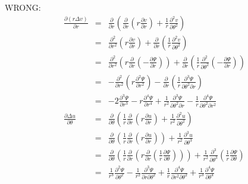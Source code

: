 WRONG:
\begin{eqnarray}
\frac{\partial (r  \Delta v)}{\partial r}
&=&
\frac{\partial}{\partial r} \left(   \frac{\partial }{\partial r} \left( r  \frac{\partial v}{\partial r} \right) +  \frac{1}{r} \frac{\partial^2 v}{\partial \theta^2}  \right) \\
&=&
\frac{\partial^2 }{\partial r^2} \left( r  \frac{\partial v}{\partial r} \right) 
+ \frac{\partial }{\partial r} \left( \frac{1}{r} \frac{\partial^2 v}{\partial \theta^2} \right) \\
&=&
\frac{\partial^2 }{\partial r^2} \left( r  \frac{\partial }{\partial r} ( - \frac{\partial \Psi}{\partial r}  ) \right) + \frac{\partial }{\partial r} \left( \frac{1}{r} \frac{\partial^2 }{\partial \theta^2} (- \frac{\partial \Psi}{\partial r}) \right) \\ 
&=&
- \frac{\partial^2 }{\partial r^2} \left( r    \frac{\partial^2 \Psi}{\partial r^2}   \right) - \frac{\partial }{\partial r} \left( \frac{1}{r} \frac{\partial^3 \Psi}{\partial \theta^2 \partial r}  \right) \\ 
&=& - 2  \frac{\partial^3 \Psi}{\partial r^3}  -  r \frac{\partial^4 \Psi}{\partial r^4}
+\frac{1}{r^2} \frac{\partial^3 \Psi}{\partial \theta^2 \partial r}  
- \frac{1}{r} \frac{\partial^4 \Psi}{\partial \theta^2 \partial r^2}
\\
\frac{\partial  \Delta u}{\partial \theta}
&=& \frac{\partial }{\partial \theta} \left(
\frac{1}{r} \frac{\partial }{\partial r} \left( r  \frac{\partial u}{\partial r} \right) 
+  \frac{1}{r^2} \frac{\partial^2 u}{\partial \theta^2}  \right)\\
&=& \frac{\partial }{\partial \theta} \left(
\frac{1}{r} \frac{\partial }{\partial r} \left( r  \frac{\partial u}{\partial r} \right) \right)
+  \frac{1}{r^2} \frac{\partial^3 u}{\partial \theta^3}  \\
&=& \frac{\partial }{\partial \theta} \left(
\frac{1}{r} \frac{\partial }{\partial r} \left( r  \frac{\partial }{\partial r} (  \frac{1}{r}\frac{\partial \Psi}{\partial \theta}  ) \right) \right)
+  \frac{1}{r^2} \frac{\partial^3 }{\partial \theta^3}( \frac{1}{r}\frac{\partial \Psi}{\partial \theta})  \\
&=&
\frac{1}{r^3} \frac{\partial^2 \Psi}{\partial \theta^2} - 
\frac{1}{r^2} \frac{\partial^3 \Psi}{\partial r \partial \theta^2} +
\frac{1}{r} \frac{\partial^4 \Psi}{\partial r^2 \partial \theta^2} +
\frac{1}{r^3} \frac{\partial^4 \Psi}{\partial \theta^4} 
\end{eqnarray}

